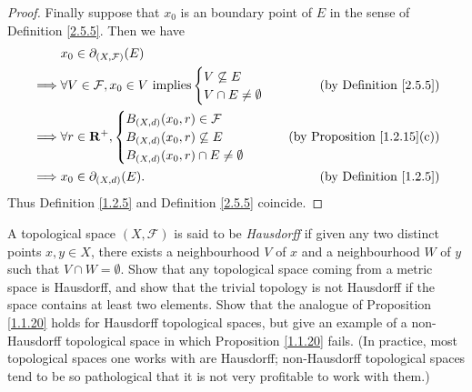 \begin{proof}
    Finally suppose that \(x_0\) is an boundary point of \(E\) in the sense of Definition \ref{2.5.5}.
    Then we have
    \begin{align*}
                 & x_0 \in \partial_{(X, \mathcal{F})}(E)                                                                  \\
        \implies & \forall V \in \mathcal{F}, x_0 \in V \text{ implies} \begin{cases}
                                                                            V \not\subseteq E \\
                                                                            V \cap E \neq \emptyset
                                                                        \end{cases} & \text{(by Definition \ref{2.5.5})}   \\
        \implies & \forall r \in \mathbf{R}^+, \begin{cases}
                                           B_{(X, d)}(x_0, r) \in \mathcal{F} \\
                                           B_{(X, d)}(x_0, r) \not\subseteq E \\
                                           B_{(X, d)}(x_0, r) \cap E \neq \emptyset
                                       \end{cases}                           & \text{(by Proposition \ref{1.2.15}(c))}     \\
        \implies & x_0 \in \partial_{(X, d)}(E).                                      & \text{(by Definition \ref{1.2.5})}
    \end{align*}
    Thus Definition \ref{1.2.5} and Definition \ref{2.5.5} coincide.
\end{proof}

\begin{exercise}\label{ex 2.5.4}
    A topological space \((X, \mathcal{F})\) is said to be \emph{Hausdorff} if given any two distinct points \(x, y \in X\), there exists a neighbourhood \(V\) of \(x\) and a neighbourhood \(W\) of \(y\) such that \(V \cap W = \emptyset\).
    Show that any topological space coming from a metric space is Hausdorff, and show that the trivial topology is not Hausdorff if the space contains at least two elements.
    Show that the analogue of Proposition \ref{1.1.20} holds for Hausdorff topological spaces, but give an example of a non-Hausdorff topological space in which Proposition \ref{1.1.20} fails.
    (In practice, most topological spaces one works with are Hausdorff;
    non-Hausdorff topological spaces tend to be so pathological that it is not very profitable to work with them.)
\end{exercise}

